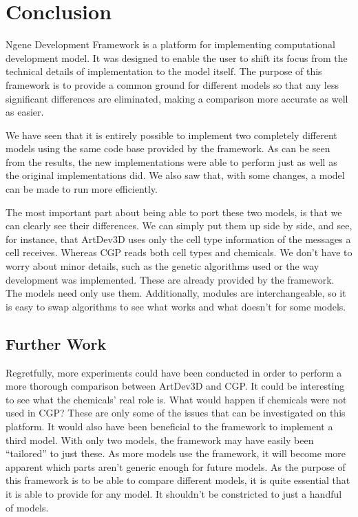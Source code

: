 \section{Conclusion}
Ngene Development Framework is a platform for implementing computational development model. It was designed to enable the user to shift its focus from the technical details of implementation to the model itself. The purpose of this framework is to provide a common ground for different models so that any less significant differences are eliminated, making a comparison more accurate as well as easier.

We have seen that it is entirely possible to implement two completely different models using the same code base provided by the framework. As can be seen from the results, the new implementations were able to perform just as well as the original implementations did. We also saw that, with some changes, a model can be made to run more efficiently.

The most important part about being able to port these two models, is that we can clearly see their differences. We can simply put them up side by side, and see, for instance, that ArtDev3D uses only the cell type information of the messages a cell receives. Whereas CGP reads both cell types and chemicals. We don't have to worry about minor details, such as the genetic algorithms used or the way development was implemented. These are already provided by the framework. The models need only use them. Additionally, modules are interchangeable, so it is easy to swap algorithms to see what works and what doesn't for some models.


\subsection{Further Work}

Regretfully, more experiments could have been conducted in order to perform a more thorough comparison between ArtDev3D and CGP. It could be interesting to see what the chemicals' real role is. What would happen if chemicals were not used in CGP? These are only some of the issues that can be investigated on this platform. It would also have been beneficial to the framework to implement a third model. With only two models, the framework may have easily been ``tailored'' to just these. As more models use the framework, it will become more apparent which parts aren't generic enough for future models. As the purpose of this framework is to be able to compare different models, it is quite essential that it is able to provide for any model. It shouldn't be constricted to just a handful of models.

